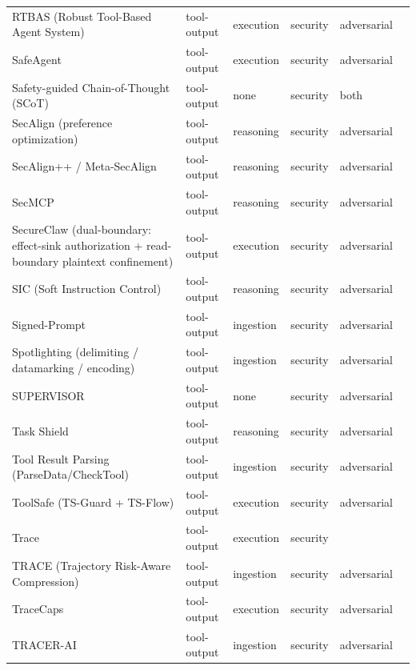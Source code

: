 \begin{longtable}{@{}>{\raggedright\arraybackslash}p{}lllll@{}}
RTBAS (Robust Tool-Based Agent System) & tool-output & execution & security & adversarial & \cite{zhong-2025-rtbas} \\
SafeAgent & tool-output & execution & security & adversarial & \cite{liu-2026-safeagent} \\
Safety-guided Chain-of-Thought (SCoT) & tool-output & none & security & both & \cite{lee-2024-mobilesafetybench} \\
SecAlign (preference optimization) & tool-output & reasoning & security & adversarial & \cite{chen-2024-secalign} \\
SecAlign++ / Meta-SecAlign & tool-output & reasoning & security & adversarial & \cite{chen-2025-meta} \\
SecMCP & tool-output & reasoning & security & adversarial & \cite{shi-2025-quantifying} \\
SecureClaw (dual-boundary: effect-sink authorization + read-boundary plaintext confinement) & tool-output & execution & security & adversarial & \cite{ma-2026-secureclaw} \\
SIC (Soft Instruction Control) & tool-output & reasoning & security & adversarial & \cite{walter-2025-soft} \\
Signed-Prompt & tool-output & ingestion & security & adversarial & \cite{suo-2024-signedprompt} \\
Spotlighting (delimiting / datamarking / encoding) & tool-output & ingestion & security & adversarial & \cite{hines-2024-defending} \\
SUPERVISOR & tool-output & none & security & adversarial & \cite{wu-2026-bots} \\
Task Shield & tool-output & reasoning & security & adversarial & \cite{jia-2024-task} \\
Tool Result Parsing (ParseData/CheckTool) & tool-output & ingestion & security & adversarial & \cite{yu-2026-defense} \\
ToolSafe (TS-Guard + TS-Flow) & tool-output & execution & security & adversarial & \cite{mou-2026-toolsafe} \\
Trace & tool-output & execution & security &  & \cite{ediga-2026-trace} \\
TRACE (Trajectory Risk-Aware Compression) & tool-output & ingestion & security & adversarial & \cite{hong-2026-trace} \\
TraceCaps & tool-output & execution & security & adversarial & \cite{catarino-2026-tracecaps} \\
TRACER-AI & tool-output & ingestion & security & adversarial & \cite{singh-2026-tracerai} \\

\end{longtable}
